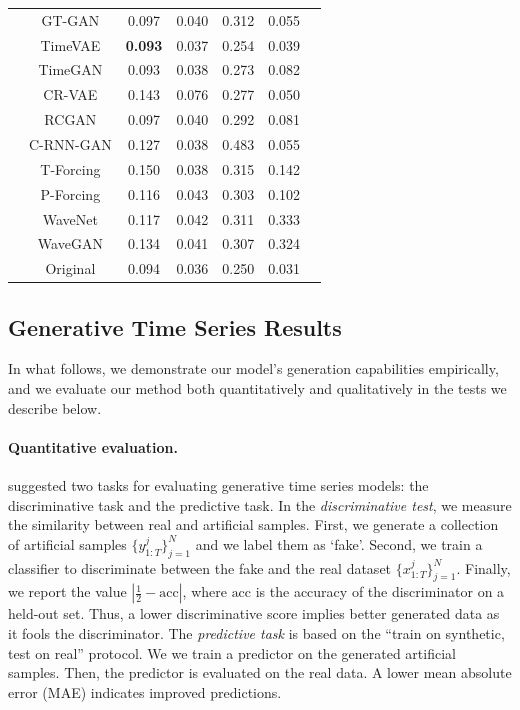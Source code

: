 \documentclass{article} %
\begin{document}
\begin{table}[!b]
{\begin{minipage}{.5\linewidth}
\begin{tabular}{ccccccc}
        \midrule
        & GT-GAN    & 0.097  & 0.040  & 0.312  & 0.055      \\
        & TimeVAE   &\cellcolor{blue!10}\textbf{ 0.093}   & 0.037  & 0.254  &  0.039       \\ 
        & TimeGAN   & 0.093  & 0.038  & 0.273  & 0.082      \\ 
        & CR-VAE    & 0.143  & 0.076   & 0.277  &  0.050  \\
    & RCGAN     & 0.097  & 0.040  & 0.292  &  0.081         \\ 
        & C-RNN-GAN & 0.127  & 0.038  & 0.483  &  0.055     \\
        & T-Forcing & 0.150  & 0.038  & 0.315  &      0.142 \\ 
        & P-Forcing & 0.116  & 0.043  & 0.303  &    0.102   \\  
        & WaveNet   & 0.117  & 0.042  & 0.311  &      0.333 \\ 
        & WaveGAN   & 0.134  & 0.041  & 0.307  &   0.324    \\
        \midrule
        & Original  & 0.094  & 0.036  & 0.250  &  0.031     \\ 
        \bottomrule
    \end{tabular}
    \end{minipage} }
    \vspace{-4mm}
\end{table}

\subsection{Generative Time Series Results}

In what follows, we demonstrate our model's generation capabilities empirically, and we evaluate our method both quantitatively and qualitatively in the tests we describe below.

\paragraph{Quantitative evaluation.} \cite{yoon2019time} suggested two tasks for evaluating generative time series models: the discriminative task and the predictive task. In the \emph{discriminative test}, we measure the similarity between real and artificial samples. First, we generate a collection of artificial samples $\{y_{1:T}^j\}_{j=1}^N$ and we label them as `fake'. Second, we train a classifier to discriminate between the fake and the real dataset $\{x_{1:T}^j\}_{j=1}^N$. Finally, we report the value $|\frac{1}{2} - \text{acc}|$, where $\text{acc}$ is the accuracy of the discriminator on a held-out set. Thus, a lower discriminative score implies better generated data as it fools the discriminator. The \emph{predictive task} is based on the ``train on synthetic, test on real'' protocol. We we train a predictor on the generated artificial samples. Then, the predictor is evaluated on the real data. A lower mean absolute error (MAE) indicates improved predictions.
\end{document}
